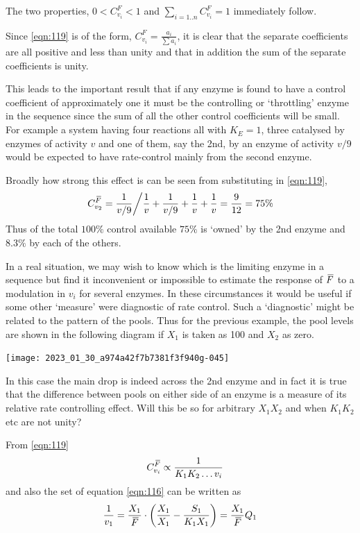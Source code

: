 The two properties, $0 < C_{v_i}^F < 1$ and $\displaystyle \sum_{i=1..n} C_{v_i}^F = 1$ immediately follow.

Since \eqref{eqn:119} is of the form, $C^{F}_{v_{i}} = \frac{a_{i}}{\sum a_{i}}$, it is clear that the separate coefficients are all positive and less than unity and that in addition the sum of the separate coefficients is unity.

This leads to the important result that if any enzyme is found to have a control coefficient of approximately one it must be the controlling or `throttling' enzyme in the sequence since the sum of all the other control coefficients will be small. For example a system having four reactions all with $K_{E}=1$, three catalysed by enzymes of activity $v$ and one of them, say the 2nd, by an enzyme of activity $v/9$ would be expected to have rate-control mainly from the second enzyme.

Broadly how strong this effect is can be seen from substituting in \eqref{eqn:119},
%
$$
C^{\,\overline{\!{F}}}_{v_2} = \frac{1}{v/9} \bigg/ \frac{1}{v} + \frac{1}{v/9} + \frac{1}{v} + \frac{1}{v} = \frac{9}{12} = 75 \%
$$
%
Thus of the total $100 \%$ control available $75 \%$ is `owned' by the 2nd enzyme and $8.3 \%$ by each of the others.

In a real situation, we may wish to know which is the limiting enzyme in a sequence but find it inconvenient or impossible to estimate the response of $\,\overline{\!{F}}$ to a modulation in $v_{i}$ for several enzymes. In these circumstances it would be useful if some other `measure' were diagnostic of rate control. Such a `diagnostic' might be related to the pattern of the pools. Thus for the previous example, the pool levels are shown in the following diagram if $X_{1}$ is taken as 100 and $X_{2}$ as zero.

\begin{center}
\texttt{[image: 2023\_01\_30\_a974a42f7b7381f3f940g-045]}
\end{center}

In this case the main drop is indeed across the 2nd enzyme and in fact it is true that the difference between pools on either side of an enzyme is a measure of its relative rate controlling effect. Will this be so for arbitrary $X_{1} X_{2}$ and when $K_{1} K_{2}$ etc are not unity?

From \eqref{eqn:119}
%
$$
 \quad C_{v_{i}}^{\,\overline{\!{F}}} \propto \frac{1}{K_{1} K_{2} \ldots v_{i}}
$$
%
and also the set of equation \eqref{eqn:116}  can be written as
$$
\frac{1}{v_{1}} = \frac{X_{1}}{\,\overline{\!{F}}} \cdot\left(\frac{X_{1}}{X_{1}}-\frac{S_{1}}{K_{1} X_{1}}\right) = \frac{X_{1}}{\,\overline{\!{F}}} Q_{1}
$$

